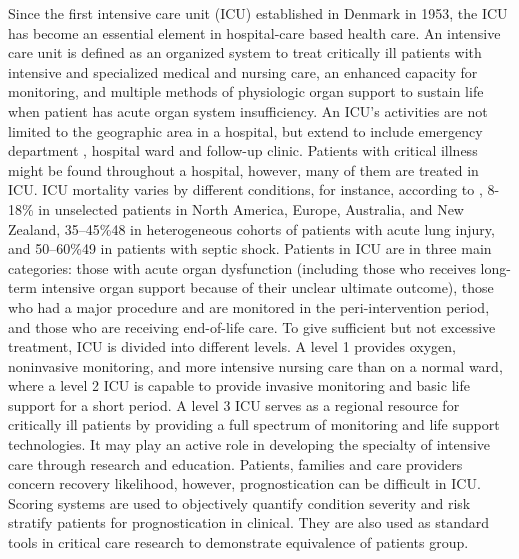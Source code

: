 \documentclass[12pt,a4paper,english
]{tunithesis}
\begin{document}
Since the first intensive care unit (ICU) established in Denmark in 1953, the ICU has become an essential element in hospital-care based health care. An intensive care unit is defined as an organized system to treat critically ill patients with intensive and specialized medical and nursing care, an enhanced capacity for monitoring, and multiple methods of physiologic organ support to sustain life when patient has acute organ system insufficiency. An ICU's activities are not limited to the geographic area in a hospital, but extend to include emergency department , hospital ward and follow-up clinic. \parencite{Marshell2017} Patients with critical illness might be found throughout a hospital, however, many of them are treated in ICU. ICU mortality varies by different conditions, for instance, according to \textcite{Adhikari2010}, 8-18\% in unselected patients in North America, Europe, Australia, and New Zealand, 35–45\%48 in heterogeneous cohorts of patients with acute lung injury, and 50–60\%49 in patients with septic shock. Patients in ICU are in three main categories: those with acute organ dysfunction (including those who receives long-term intensive organ support because of their unclear ultimate outcome), those who had a major procedure and are monitored in the peri-intervention period, and those who are receiving end-of-life care. To give sufficient but not excessive treatment, ICU is divided into different levels. A level 1 provides oxygen, noninvasive monitoring, and more intensive nursing care than on a normal ward, where a level 2 ICU is capable to provide invasive monitoring and basic life support for a short period. A level 3 ICU serves as a regional resource for critically ill patients by providing a full spectrum of monitoring and life support technologies. It may play an active role in developing the specialty of intensive care through research and education. \parencite{Marshell2017} Patients, families and care providers concern recovery likelihood, however, prognostication can be difficult in ICU. Scoring systems are used to objectively quantify condition severity and risk stratify patients for prognostication in clinical. They are also used as standard tools in critical care research to demonstrate equivalence of patients group. \parencite{Tiffany21}
\end{document}
